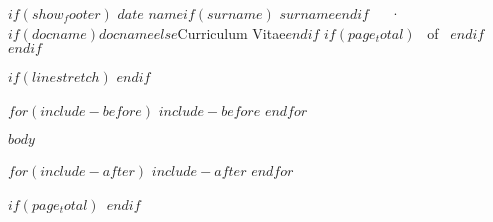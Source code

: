 \documentclass[$if(fontsize)$$fontsize$$else$11pt$endif$,$if(lang)$$babel-lang$,$endif$$if(papersize)$$papersize$$else$a4paper$endif$,$for(classoption)$$classoption$$sep$,$endfor$]{awesome-resume}
\begin{document}
\makecvheader

$if(show_footer)$
\makecvfooter
  {$date$}
    {$name$$if(surname)$ $surname$$endif$~~~·~~~$if(docname)$$docname$$else$Curriculum Vitae$endif$}
  {\thepage$if(page_total)$~ of \pageref{LastPage}~$endif$}
$endif$



$if(linestretch)$
$endif$

$for(include-before)$
$include-before$
$endfor$

$body$

$for(include-after)$
$include-after$
$endfor$

$if(page_total)$\label{LastPage}~$endif$
\end{document}
